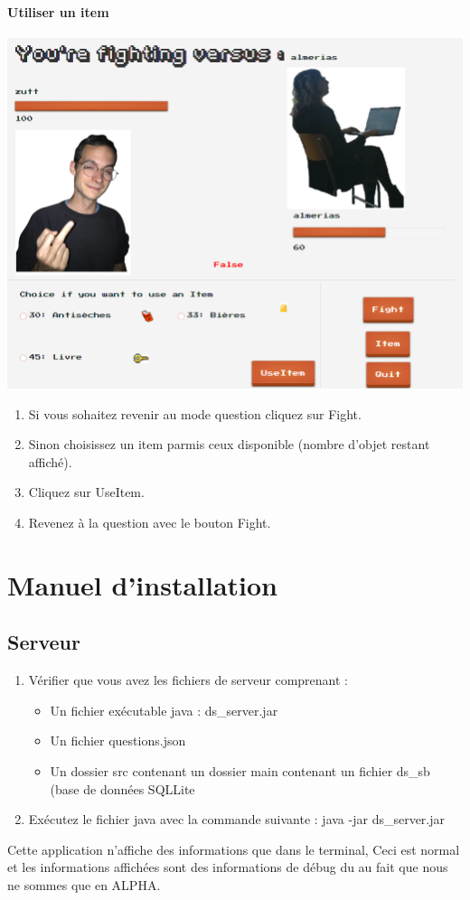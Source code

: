 \documentclass[a4paper,10pt]{report}
\begin{document}
\subsubsection{Utiliser un item}
\includegraphics[scale=0.3]{images/item.png}
\begin{enumerate}
 \item Si vous sohaitez revenir au mode question cliquez sur Fight.
 \item Sinon choisissez un item parmis ceux disponible (nombre d'objet restant affiché).
 \item Cliquez sur UseItem.
 \item Revenez à la question avec le bouton Fight.
\end{enumerate}

\chapter{Manuel d'installation}

\section{Serveur}
\begin{enumerate}
 \item Vérifier que vous avez les fichiers de serveur comprenant :
\begin{itemize}
 \item Un fichier exécutable java : ds\_server.jar
 \item Un fichier questions.json
 \item Un dossier src contenant un dossier main contenant un fichier ds\_sb (base de données SQLLite
\end{itemize}
 \item Exécutez le fichier java avec la commande suivante : java -jar ds\_server.jar
\end{enumerate}
Cette application n'affiche des informations que dans le terminal, Ceci est 
 normal et les informations affichées sont des informations de débug du au fait que nous ne sommes que en ALPHA.
 
\end{document}
